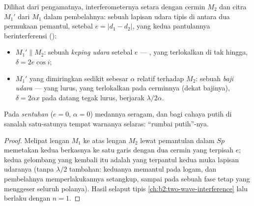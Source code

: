 \begin{proposition}\label{prop:b2:michelson:equivalent}
Dilihat dari pengamatnya, interferometernya setara dengan cermin
$M_2$ dan citra $M_1'$ dari $M_1$ dalam pembelahnya: sebuah lapisan udara tipis
di antara dua permukaan pemantul, setebal $e = |d_1 - d_2|$, yang kedua
pantulannya berinterferensi ():
\begin{itemize}
  \item $M_1' \parallel M_2$: sebuah \emph{keping udara} setebal $e$ --- , yang terlokalkan di tak hingga, $\delta = 2e\cos i$;
  \item $M_1'$ yang dimiringkan sedikit sebesar $\alpha$ relatif terhadap $M_2$: sebuah \emph{baji udara}
        ---  yang lurus, yang terlokalkan pada
        cerminnya (dekat bajinya), $\delta = 2\alpha x$ pada datang tegak lurus,
        berjarak $\lambda/2\alpha$.
\end{itemize}
Pada \emph{sentuhan} ($e = 0$, $\alpha = 0$) medannya seragam, dan bagi cahaya
putih di sanalah satu-satunya tempat warnanya selaras: ``rumbai putih''-nya.
\end{proposition}

\begin{proof}
Melipat lengan $M_1$ ke atas lengan $M_2$ lewat pemantulan dalam $Sp$ memetakan
kedua berkasnya ke satu garis dengan dua cermin yang terpisah $e$; kedua gelombang
yang kembali itu adalah yang terpantul kedua muka lapisan udaranya (tanpa
$\lambda/2$ tambahan: keduanya memantul pada logam, dan pembelahnya memperlakukannya
setangkup, sampai pada sebuah fase tetap yang menggeser seluruh polanya).
Hasil selaput tipis \cref{ch:b2:two-wave-interference} lalu berlaku
dengan $n = 1$.
\end{proof}

